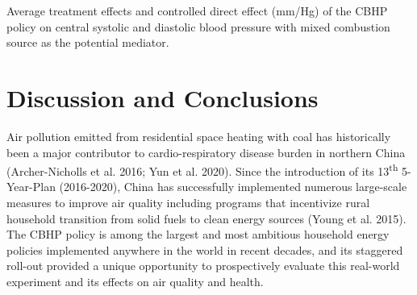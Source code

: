 \documentclass[
  letterpaper,
  DIV=11,
  numbers=noendperiod]{scrartcl}
\makeatletter
\renewenvironment{table}%
   {\renewcommand\familydefault\sfdefault
    \@float{table}}
   {\end@float}
\makeatother
\begin{document}
\begin{table}

\caption{\label{tbl-med-source}Average treatment effects and controlled
direct effect (mm/Hg) of the CBHP policy on central systolic and
diastolic blood pressure with mixed combustion source as the potential
mediator.}


\end{table}%

\section{Discussion and Conclusions}\label{discussion-and-conclusions}

Air pollution emitted from residential space heating with coal has
historically been a major contributor to cardio-respiratory disease
burden in northern China (Archer-Nicholls et al. 2016; Yun et al. 2020).
Since the introduction of its 13\textsuperscript{th} 5-Year-Plan
(2016-2020), China has successfully implemented numerous large-scale
measures to improve air quality including programs that incentivize
rural household transition from solid fuels to clean energy sources
(Young et al. 2015). The CBHP policy is among the largest and most
ambitious household energy policies implemented anywhere in the world in
recent decades, and its staggered roll-out provided a unique opportunity
to prospectively evaluate this real-world experiment and its effects on
air quality and health.
\end{document}
